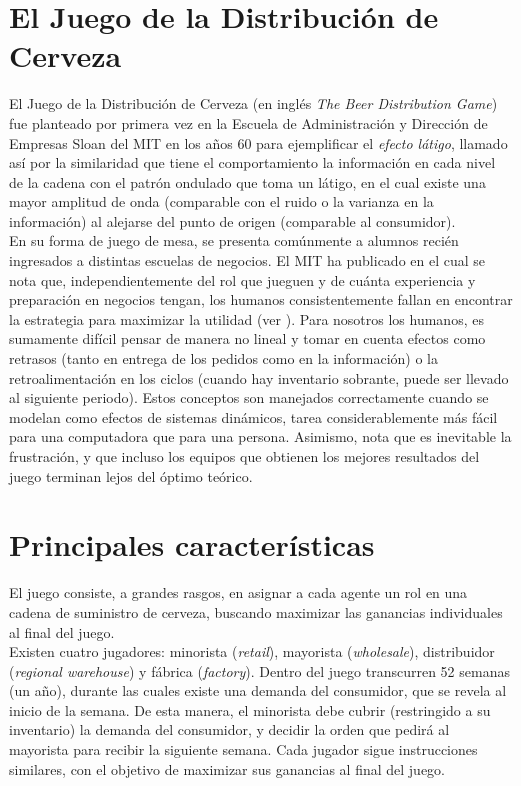 \section{El Juego de la Distribuci\'on de Cerveza}

El Juego de la Distribuci\'on de Cerveza (en ingl\'es \textit{The Beer Distribution Game}) \cite{StermanArt} fue planteado por primera vez en la Escuela de Administraci\'on y Direcci\'on de Empresas Sloan del MIT en los años 60 para ejemplificar el \textit{efecto l\'atigo}, llamado as\'i por la similaridad que tiene el comportamiento la informaci\'on en cada nivel de la cadena con el patr\'on ondulado que toma un l\'atigo, en el cual existe una mayor amplitud de onda (comparable con el ruido o la varianza en la informaci\'on) al alejarse del punto de origen (comparable al consumidor). \\

En su forma de juego de mesa, se presenta com\'unmente a alumnos reci\'en ingresados a distintas escuelas de negocios. El MIT ha publicado en el cual se nota que, independientemente del rol que jueguen y de cu\'anta experiencia y preparaci\'on en negocios tengan, los humanos consistentemente fallan en encontrar la estrategia para maximizar la utilidad (ver \citet{Dizikes}). Para nosotros los humanos, es sumamente dif\'icil pensar de manera no lineal y tomar en cuenta efectos como retrasos (tanto en entrega de los pedidos como en la informaci\'on) o la retroalimentaci\'on en los ciclos (cuando hay inventario sobrante, puede ser llevado al siguiente periodo). Estos conceptos son manejados correctamente cuando se modelan como efectos de sistemas din\'amicos, tarea considerablemente m\'as f\'acil para una computadora que para una persona. Asimismo, nota que es inevitable la frustraci\'on, y que incluso los equipos que obtienen los mejores resultados del juego terminan lejos del \'optimo te\'orico.\\

\section{Principales caracter\'isticas}

El juego consiste, a grandes rasgos, en asignar a cada agente un rol en una cadena de suministro de cerveza, buscando maximizar las ganancias individuales al final del juego.\\

Existen cuatro jugadores: minorista (\textit{retail}), mayorista (\textit{wholesale}), distribuidor (\textit{regional warehouse}) y f\'abrica (\textit{factory}). Dentro del juego transcurren 52 semanas (un a\~no), durante las cuales existe una demanda del consumidor, que se revela al inicio de la semana. De esta manera, el minorista debe cubrir (restringido a su inventario) la demanda del consumidor, y decidir la orden que pedir\'a al mayorista para recibir la siguiente semana. Cada jugador sigue instrucciones similares, con el objetivo de maximizar sus ganancias al final del juego.\\


